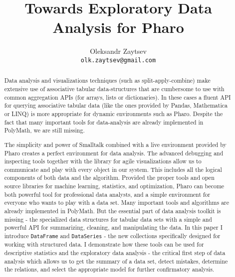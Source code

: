 \documentclass{article}
\title{Towards Exploratory Data Analysis for Pharo}
\author{
  Oleksandr Zaytsev\\
    \texttt{olk.zaytsev@gmail.com}}
\date{}
\begin{document}
\maketitle


\begin{abstract}

\noindent Data analysis and visualizations techniques (such as split-apply-combine) make extensive use of associative tabular data-structures that are cumbersome to use with common aggregation APIs (for arrays, lists or dictionaries). In these cases a fluent API for querying associative tabular data (like the ones provided by Pandas, Mathematica or LINQ) is more appropriate for dynamic environments such as Pharo. Despite the fact that many important tools for data-analysis are already implemented in PolyMath, we are still missing. 

\noindent The simplicity and power of Smalltalk combined with a live environment provided by Pharo creates a perfect environment for data analysis. The advanced debugging and inspecting tools together with the library for agile visualizations allow us to communicate and play with every object in our system. This includes all the logical components of both data and the algorithm. Provided the proper tools and open source libraries for machine learning, statistics, and optimization, Pharo can become both powerful tool for professional data analysts, and a simple environment for everyone who wants to play with a data set. Many important tools and algorithms are already implemented in PolyMath. But the essential part of data analysis toolkit is missing - the specialized data structures for tabular data sets with a simple and powerful API for summarizing, cleaning, and manipulating the data. In this paper I introduce \texttt{DataFrame} and \texttt{DataSeries} - the new collections specifically designed for working with structured data. I demonstrate how these tools can be used for descriptive statistics and the exploratory data analysis - the critical first step of data analysis which allows us to get the summary of a data set, detect mistakes, determine the relations, and select the appropriate model for further confirmatory analysis.
\end{abstract}
\end{document}
